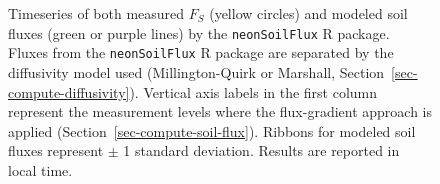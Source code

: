 \documentclass[
  letterpaper,
  DIV=11,
  numbers=noendperiod]{scrartcl}
\begin{document}
\begin{figure}


\caption{\label{fig-flux-results}Timeseries of both measured \(F_{S}\)
(yellow circles) and modeled soil fluxes (green or purple lines) by the
\texttt{neonSoilFlux} R package. Fluxes from the \texttt{neonSoilFlux} R
package are separated by the diffusivity model used (Millington-Quirk or
Marshall, Section~\ref{sec-compute-diffusivity}). Vertical axis labels
in the first column represent the measurement levels where the
flux-gradient approach is applied (Section~\ref{sec-compute-soil-flux}).
Ribbons for modeled soil fluxes represent \(\pm\) 1 standard deviation.
Results are reported in local time.}

\end{figure}%
\end{document}
